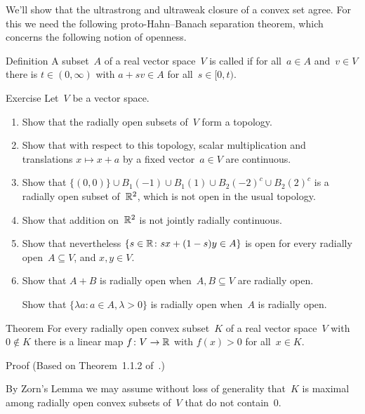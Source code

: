 \documentclass[a]{subfiles}
\begin{document}
\begin{parsec}%
\begin{point}%
We'll show that the ultrastrong and ultraweak closure
of a convex set agree. 
For this we need the following proto-Hahn--Banach separation theorem,
which concerns the following notion of openness.
\end{point}
\begin{point}{Definition}%
A subset~$A$ of a real vector space~$V$ 
is called 
if for all~$a\in A$ and~$v\in V$
there is $t\in (0,\infty)$
with $a+sv\in A$ for all~$s\in [0,t)$.
\end{point}
\begin{point}{Exercise}%
Let~$V$ be a vector space.
\begin{enumerate}
\item
Show that the radially open subsets of~$V$ form a topology.
\item
Show that with respect to this topology,
scalar multiplication and translations $x\mapsto x+a$
by a fixed vector~$a\in V$ are continuous.
\item
Show that $\{(0,0)\}\cup B_1(-1)\cup B_1(1)\cup B_2(-2)^c\cup B_2(2)^c$
is a radially open subset of~$\mathbb{R}^2$, 
which is not open
in the usual topology.


\item
Show that addition on~$\mathbb{R}^2$ is not jointly radially continuous.
\item
	Show that nevertheless $\{s\in \mathbb{R} \colon sx+(1-s) y\in A\}$
is open for every radially open~$A\subseteq V$, and $x,y\in V$.
\item
Show that $A+B$ is radially open when~$A,B\subseteq V$ are radially open.

Show that $\{\lambda a\colon a\in A,\lambda>0\}$ is radially open
when~$A$ is radially open.
\end{enumerate}
\end{point}
\begin{point}{Theorem}%
For every radially open
convex subset~$K$ of a real vector space~$V$
with~$0\notin K$
there is a linear map $f\colon V\to\mathbb{R}$
with $f(x)>0$ for all~$x\in K$.
\begin{point}{Proof}%
(Based on Theorem~1.1.2 of~\cite{kr}.)

By Zorn's Lemma we may assume without loss of generality that~$K$ is maximal
among radially open convex subsets of~$V$ that do not contain~$0$.


\end{point}
\end{point}
\end{parsec}
\end{document}
